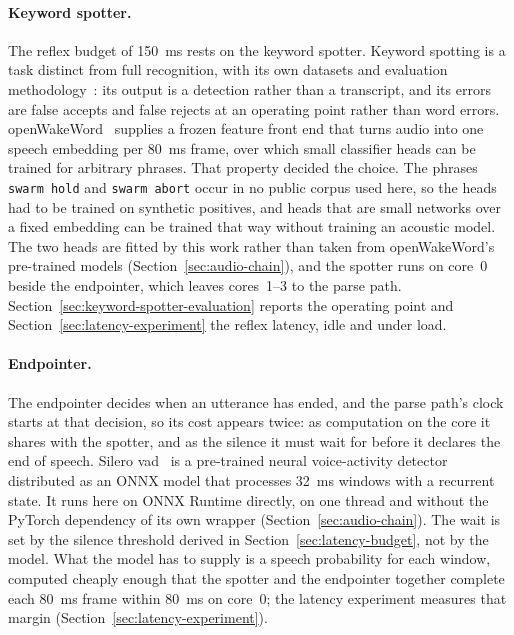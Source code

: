 \paragraph{Keyword spotter.} The reflex budget of 150~ms rests on the keyword spotter. Keyword
spotting is a task distinct from full recognition, with its own datasets and evaluation
methodology~\cite{speechcmd}: its output is a detection rather than a transcript, and its errors are
false accepts and false rejects at an operating point rather than word errors. openWakeWord~\cite{oww}
supplies a frozen feature front end that turns audio into one speech embedding per 80~ms frame, over
which small classifier heads can be trained for arbitrary phrases. That property decided the choice.
The phrases \texttt{swarm hold} and \texttt{swarm abort} occur in no public corpus used here, so the
heads had to be trained on synthetic positives, and heads that are small networks over a fixed
embedding can be trained that way without training an acoustic model. The two heads are fitted by
this work rather than taken from openWakeWord's pre-trained models (Section~\ref{sec:audio-chain}),
and the spotter runs on core~0 beside the endpointer, which leaves cores~1--3 to the parse path.
Section~\ref{sec:keyword-spotter-evaluation} reports the operating point and
Section~\ref{sec:latency-experiment} the reflex latency, idle and under load.

\paragraph{Endpointer.} The endpointer decides when an utterance has ended, and the parse path's
clock starts at that decision, so its cost appears twice: as computation on the core it shares with
the spotter, and as the silence it must wait for before it declares the end of speech. Silero
\gls{vad}~\cite{silero} is a pre-trained neural voice-activity detector distributed as an ONNX model that
processes 32~ms windows with a recurrent state. It runs here on ONNX Runtime directly, on one thread
and without the PyTorch dependency of its own wrapper (Section~\ref{sec:audio-chain}). The wait is
set by the silence threshold derived in Section~\ref{sec:latency-budget}, not by the model. What the
model has to supply is a speech probability for each window, computed cheaply enough that the
spotter and the endpointer together complete each 80~ms frame within 80~ms on core~0; the latency
experiment measures that margin (Section~\ref{sec:latency-experiment}).

